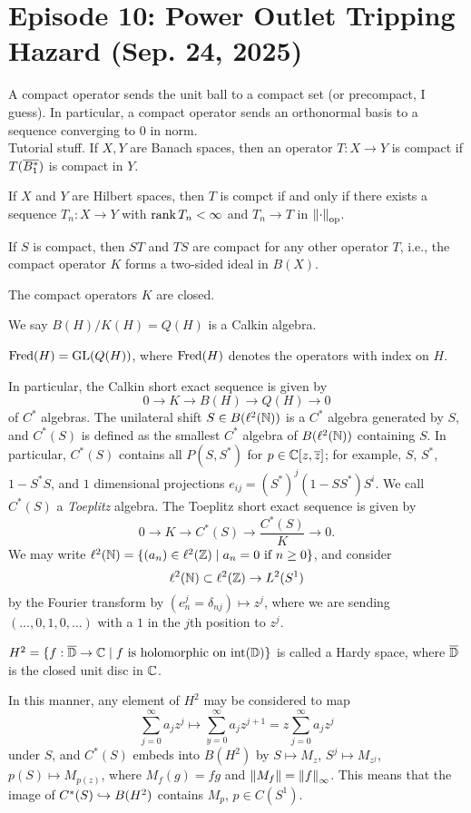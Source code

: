 \section{Episode 10: Power Outlet Tripping Hazard (Sep. 24, 2025)}
A compact operator sends the unit ball to a compact set (or precompact, I guess). In particular, a compact operator sends an orthonormal basis to a sequence converging to $0$ in norm.
\\[8pt]
Tutorial stuff. If $X, Y$ are Banach spaces, then an operator $T : X \to Y$ is compact if $T(\overline{B^\ast_1})$ is compact in $Y$.
\begin{theorem}
    If $X$ and $Y$ are Hilbert spaces, then $T$ is compct if and only if there exists a sequence $T_n : X \to Y$ with $\operatorname{rank} T_n < \infty$ and $T_n \to T$ in $\left\lVert \cdot \right\rVert_{\mathrm{op}}$.
\end{theorem}
\begin{fact}
    If $S$ is compact, then $ST$ and $TS$ are compact for any other operator $T$, i.e., the compact operator $K$ forms a two-sided ideal in $B(X)$.
\end{fact}
\begin{fact}
    The compact operators $K$ are closed.
\end{fact}
\begin{definition}
    We say $B(H)/K(H) = Q(H)$ is a Calkin algebra.
\end{definition}
\begin{theorem}[Atkinson]
    $\operatorname{Fred}(H) = \operatorname{GL}(Q(H))$, where $\operatorname{Fred}(H)$ denotes the operators with index on $H$.
\end{theorem}
\noindent In particular, the Calkin short exact sequence is given by
\[ 0 \to K \to B(H) \to Q(H) \to 0 \]
of $C^\ast$ algebras. The unilateral shift $S \in B(\ell^2(\mathbb N))$ is a $C^\ast$ algebra generated by $S$, and $C^\ast(S)$ is defined as the smallest $C^\ast$ algebra of $B(\ell^2(\mathbb N))$ containing $S$. In particular, $C^\ast(S)$ contains all $P(S, S^\ast)$ for $p \in \mathbb C[z, \overline z]$; for example, $S$, $S^\ast$, $1 - S^\ast S$, and $1$ dimensional projections $e_{ij} = (S^\ast)^j (1 - SS^\ast) S^i$. We call $C^\ast(S)$ a \textit{Toeplitz} algebra. The Toeplitz short exact sequence is given by
\[ 0 \to K \to C^\ast(S) \to \frac{C^\ast(S)}{K} \to 0. \]
We may write $\ell^2(\mathbb N) = \{(a_n) \in \ell^2(\mathbb Z) \mid a_n = 0 \text{ if } n \geq 0\}$, and consider
\[ \ell^2(\mathbb N) \subset \ell^2(\mathbb Z) \to L^2(S^1) \]
by the Fourier transform by $(e_n^j = \delta_{nj}) \mapsto z^j$, where we are sending $(\dots, 0, 1, 0, \dots)$ with a $1$ in the $j$th position to $z^j$.
\begin{definition}
    $H^2 = \{f : \overline {\mathbb D} \to \mathbb C \mid f \text{ is holomorphic on } \mathrm{int}(\mathbb D)\}$ is called a Hardy space, where $\overline {\mathbb D}$ is the closed unit disc in $\mathbb C$.
\end{definition}
\noindent In this manner, any element of $H^2$ may be considered to map
\[ \sum_{j=0}^\infty a_jz^j \mapsto \sum_{y=0}^\infty a_j z^{j+1} = z \sum_{j=0}^\infty a_j z^j \]
under $S$, and $C^\ast(S)$ embeds into $B(H^2)$ by $S \mapsto M_z$, $S^j \mapsto M_{z^j}$, $p(S) \mapsto M_{p(z)}$, where $M_f(g) = fg$ and $\left\lVert M_f \right\rVert = \left\lVert f \right\rVert_\infty$. This means that the image of $C^\ast(S) \hookrightarrow B(H^2)$ contains $M_p$, $p \in C(S^1)$.